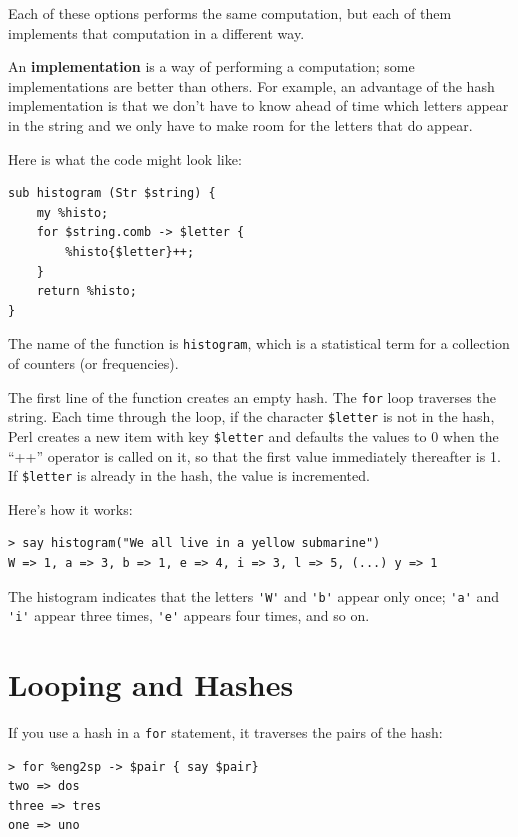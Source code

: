 Each of these options performs the same computation, but each
of them implements that computation in a different way.

An {\bf implementation} is a way of performing a computation;
some implementations are better than others.  For example,
an advantage of the hash implementation is that we don't
have to know ahead of time which letters appear in the string
and we only have to make room for the letters that do appear.

Here is what the code might look like:

\begin{verbatim}
sub histogram (Str $string) {
    my %histo;
    for $string.comb -> $letter {
        %histo{$letter}++;
    }
    return %histo;
}
\end{verbatim}
%
The name of the function is {\tt histogram}, which is a statistical
term for a collection of counters (or frequencies).

The first line of the
function creates an empty hash.  The {\tt for} loop traverses
the string.  Each time through the loop, if the character \verb'$letter' is
not in the hash, Perl creates a new item with key 
\verb'$letter' and defaults the values to 0 when the ``++'' 
operator is called on it, so that the first value immediately 
thereafter is 1.  If \verb'$letter'  is already in the hash,
the value is incremented.

Here's how it works:

\begin{verbatim}
> say histogram("We all live in a yellow submarine")
W => 1, a => 3, b => 1, e => 4, i => 3, l => 5, (...) y => 1
\end{verbatim}
%
The histogram indicates that the letters \verb"'W'" and 
\verb"'b'" appear only once; \verb"'a'" and \verb"'i'" 
appear three times, \verb"'e'" appears four times, and so on.

\section{Looping and Hashes}

If you use a hash in a {\tt for} statement, it traverses
the pairs of the hash:

\begin{verbatim}
> for %eng2sp -> $pair { say $pair}
two => dos
three => tres
one => uno
\end{verbatim}
%

